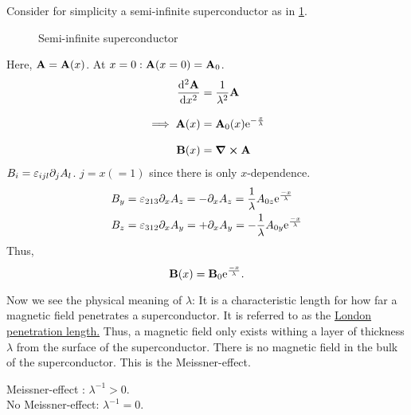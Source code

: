 Consider for simplicity a semi-infinite superconductor as in \cref{fig:semi_infinite_superconductor}.
\begin{figure}
	\centering
{}
\caption{Semi-infinite superconductor}
\label{fig:semi_infinite_superconductor}
\end{figure}
Here, $\vb A = \vb A(x)$. At $x=0: \vb A(x=0) = \vb A_0$.
\begin{align} 
\dv[2]{\vb A}{x} &= \dfrac{1}{\lambda^2}\vb A  \\[2ex]
\implies \vb A(x) &= \vb A_0(x)\mathrm{e}^{-\frac{x}{\lambda}} \\[2ex]
\vb B(x) &= \curl{\vb A}
\end{align}
$B_i = \varepsilon_{ijl}\partial_j A_l$. $j = x(=1)$ since there is only $x$-dependence. 
\begin{align*} 
B_y &= \varepsilon_{213}\partial_x A_z =-\partial_xA_z = \frac1\lambda A_{0z}\mathrm{e}^{\frac{-x}{\lambda}} \\
B_z &= \varepsilon_{312}\partial_x A_y =+\partial_xA_y = - \frac1\lambda A_{0y}\mathrm{e}^{\frac{-x}{\lambda}}
\end{align*}
Thus, 
\begin{equation} 
\vb B(x) = \vb B_0\mathrm{e}^{\frac{-x}{\lambda}}.
\end{equation}

\begin{figure}
	\centering
	
\end{figure}
Now we see the physical meaning of $\lambda$: It is a characteristic length for how far a magnetic field penetrates a superconductor. It is referred to as the \underline{London penetration length.}
Thus, a magnetic field only exists withing a layer of thickness $\lambda$ from the surface of the superconductor. There is no magnetic field in the bulk of the superconductor. This is the Meissner-effect.
\begin{tcolorbox}[center, width = 0.5\textwidth]
	\centering
	Meissner-effect : $\lambda^{-1} >0$. \\[2ex]
	No Meissner-effect: $\lambda^{-1} = 0$. 
\end{tcolorbox}

